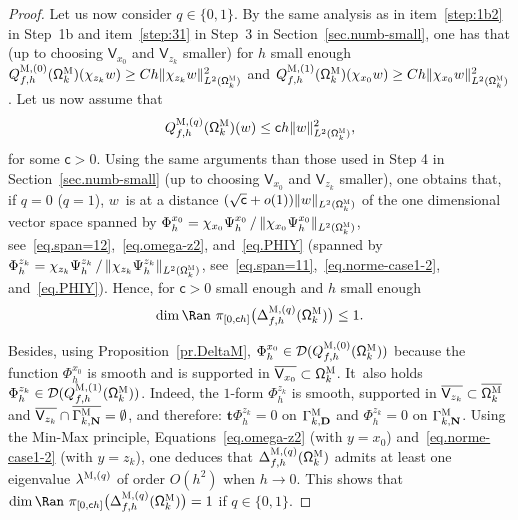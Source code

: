 \documentclass[10pt]{amsart}
\newcommand{\mbf}[1]{\mathbf{#1}}
\theoremstyle{plain}
\theoremstyle{definition}
\begin{document}
\begin{proof}
Let us now consider $q\in\{0,1\}$. By the same analysis as in
item~\eqref{step:1b2} in Step~1b and item~\eqref{step:31} in Step~3 in
Section~\ref{sec.numb-small}, one has that (up to choosing $\mathsf V_{x_0}$ and $\mathsf V_{z_k}$ smaller) for $h$ small enough
$ Q_{f,h}^{\textsc{M},(0)}(\mathsf \Omega_k^{\textsc{M}})(\chi_{z_k} w)\ge Ch \Vert \chi_{z_k} w \Vert_{L^2(\mathsf \Omega_k^{\textsc{M}})}^2$
and
$ Q_{f,h}^{\textsc{M},(1)}(\mathsf \Omega_k^{\textsc{M}})(\chi_{x_0} w)\ge Ch \Vert \chi_{x_0} w \Vert_{L^2(\mathsf \Omega_k^{\textsc{M}})}^2$.
Let us now assume that
\[
Q_{f,h}^{\textsc{M},(q)}(\mathsf \Omega_k^{\textsc{M}})(w) \le \mathsf ch\Vert w \Vert_{L^2(\mathsf \Omega_k^{\textsc{M}})}^2,
\]
for some $\mathsf c>0$. Using the same arguments than those used in Step 4 in Section~\ref{sec.numb-small} (up to choosing $\mathsf V_{x_0}$ and $\mathsf V_{z_k}$ smaller), one obtains that, if $q=0$ (\resp $q=1$), $w$~is at a distance $(\sqrt {\mathsf c} +o(1))\Vert w \Vert_{L^2(\mathsf \Omega_k^{\textsc{M}})}$ of the one dimensional vector space spanned by $\Phi_h^{x_0}= \chi_{x_0}\Psi_h^{x_0}\, /\, \Vert \chi_{x_0} \Psi_h^{x_0} \Vert_{L^2(\mathsf \Omega_k^{\textsc{M}})}$, see~\eqref{eq.span=12},~\eqref{eq.omega-z2}, and~\eqref{eq.PHIY} (\resp spanned by $\Phi_h^{z_k}=\chi_{z_k}\Psi_h^{z_k}\, /\, \Vert \chi_{z_k} \Psi_h^{z_k} \Vert_{L^2(\mathsf \Omega_k^{\textsc{M}})}$, see~\eqref{eq.span=11},~\eqref{eq.norme-case1-2}, and~\eqref{eq.PHIY}). Hence, for $\mathsf c>0$ small enough and $h$ small enough
\[
\dim\Ran \ \pi_{[0,\mathsf ch ]}\bigl(\Delta_{f,h}^{\textsc{M},(q)}
(\mathsf \Omega_k^{\textsc{M}})\bigr)\le 1.
\]

Besides, using
Proposition~\ref{pr.DeltaM}, $\Phi_h^{x_0}\in \mathcal
D(Q_{f,h}^{\textsc{M},(0)}(\mathsf \Omega_k^{\textsc{M}}))$ because
the function $\Phi_h^{x_0}$ is smooth and is supported in $\overline
{\mathsf V_{x_0}}\subset \mathsf \Omega_k^{\textsc{M}}$. It~also holds
$\Phi_h^{z_k}\in \mathcal D(Q_{f,h}^{\textsc{M},(1)}(\mathsf
\Omega_k^{\textsc{M}}))$. Indeed, the $1$-form $\Phi_h^{z_k}$ is
smooth, supported in $ \overline {\mathsf V_{z_k}} \subset
\overline{\mathsf \Omega_k^{\textsc{M}}}$ and $\overline {\mathsf
V_{z_k}} \cap \overline{\Gamma_{k,\mbf N}^{\textsc{M}}}=\emptyset$,
and therefore: $\mbf t \Phi_h^{z_k}= 0$ on $\Gamma_{k,\mbf
D}^{\textsc{M}}$ and $\Phi_h^{z_k}=0$ on $\Gamma_{k,\mbf
N}^{\textsc{M}}$. Using the Min-Max principle,
Equations~\eqref{eq.omega-z2} (with $y=x_0$)
and~\eqref{eq.norme-case1-2} (with $y=z_k$), one deduces that
$\Delta_{f,h}^{\textsc{M},(q)}(\mathsf \Omega_k^{\textsc{M}})$
admits at least one eigenvalue $\lambda^{\textsc{M}, (q)}$ of order
$O(h^{2})$ when $h\to 0$. This shows that $\dim\Ran \ \pi_{[0,\mathsf ch ]}\bigl(\Delta_{f,h}^{\textsc{M},(q)}
(\mathsf \Omega_k^{\textsc{M}})\bigr)= 1$ if $q \in \{0,1\}$.


\end{proof}
\end{document}
